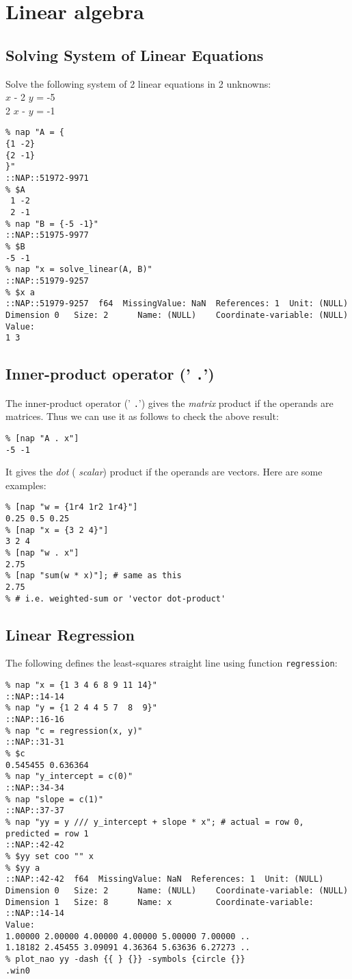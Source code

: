     \section{Linear algebra}

  \subsection{Solving System of Linear Equations}
Solve the following system
  of 2 linear equations in 2 unknowns:
  \\
  $x$ - 2 
  $y$ = -5
  \\2 
  $x$ - 
  $y$ = -1
  \begin{verbatim}
% nap "A = {
{1 -2}
{2 -1}
}"
::NAP::51972-9971
% $A
 1 -2
 2 -1
% nap "B = {-5 -1}"
::NAP::51975-9977
% $B
-5 -1
% nap "x = solve_linear(A, B)"
::NAP::51979-9257
% $x a
::NAP::51979-9257  f64  MissingValue: NaN  References: 1  Unit: (NULL)
Dimension 0   Size: 2      Name: (NULL)    Coordinate-variable: (NULL)
Value:
1 3
\end{verbatim}

  \subsection{Inner-product operator (' 
  \texttt{.}')}
The inner-product operator (' 
  \texttt{.}') gives the 
  \textit{matrix} product if the operands are matrices. Thus we can use
  it as follows to check the above result:
  \begin{verbatim}
% [nap "A . x"]
-5 -1
\end{verbatim}

It gives the 
  \textit{dot} ( 
  \textit{scalar}) product if the operands are vectors. Here are some
  examples:
  \begin{verbatim}
% [nap "w = {1r4 1r2 1r4}"]
0.25 0.5 0.25
% [nap "x = {3 2 4}"]
3 2 4
% [nap "w . x"]
2.75
% [nap "sum(w * x)"]; # same as this
2.75
% # i.e. weighted-sum or 'vector dot-product'
\end{verbatim}

  \subsection{Linear Regression}
The following defines the least-squares
  straight line using function 
  \texttt{regression}:
  \begin{verbatim}
% nap "x = {1 3 4 6 8 9 11 14}"
::NAP::14-14
% nap "y = {1 2 4 4 5 7  8  9}"
::NAP::16-16
% nap "c = regression(x, y)"
::NAP::31-31
% $c
0.545455 0.636364
% nap "y_intercept = c(0)"
::NAP::34-34
% nap "slope = c(1)"
::NAP::37-37
% nap "yy = y /// y_intercept + slope * x"; # actual = row 0,
predicted = row 1
::NAP::42-42
% $yy set coo "" x
% $yy a
::NAP::42-42  f64  MissingValue: NaN  References: 1  Unit: (NULL)
Dimension 0   Size: 2      Name: (NULL)    Coordinate-variable: (NULL)
Dimension 1   Size: 8      Name: x         Coordinate-variable:
::NAP::14-14
Value:
1.00000 2.00000 4.00000 4.00000 5.00000 7.00000 ..
1.18182 2.45455 3.09091 4.36364 5.63636 6.27273 ..
% plot_nao yy -dash {{ } {}} -symbols {circle {}}
.win0
\end{verbatim}

